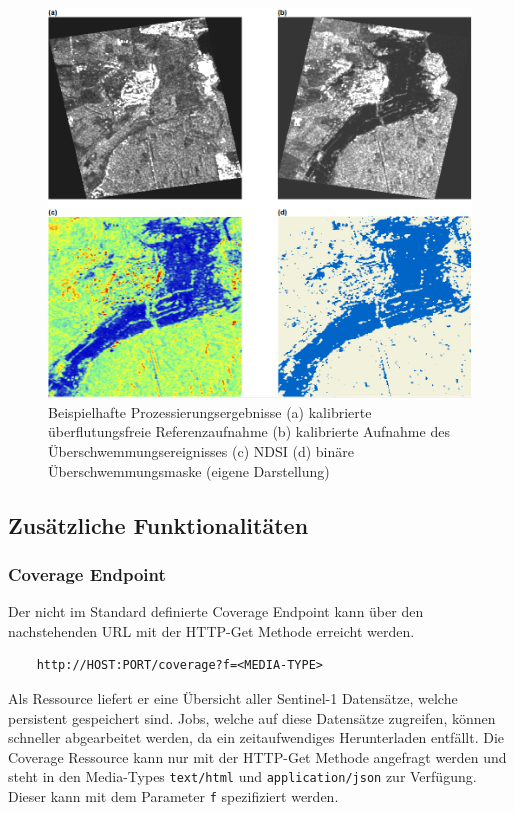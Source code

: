 \begin{figure}[H]
    \centering
    \includegraphics[width=\textwidth]{Bilder/prozess.png}
    \caption{Beispielhafte Prozessierungsergebnisse (a) kalibrierte überflutungsfreie Referenzaufnahme (b) kalibrierte Aufnahme des Überschwemmungsereignisses (c) NDSI  (d) binäre Überschwemmungsmaske (eigene Darstellung)}
    \label{pre_post_ndsi}
\end{figure}


\subsection{Zusätzliche Funktionalitäten}
\subsubsection{Coverage Endpoint} 
Der nicht im Standard definierte Coverage Endpoint kann über den nachstehenden URL mit der HTTP-Get Methode erreicht werden. 
\begin{center}
\begin{BVerbatim}
    http://HOST:PORT/coverage?f=<MEDIA-TYPE>
\end{BVerbatim}
\end{center}
Als Ressource liefert er eine Übersicht aller Sentinel-1 Datensätze, welche persistent gespeichert sind. 
Jobs, welche auf diese Datensätze zugreifen, können schneller abgearbeitet werden, da ein zeitaufwendiges Herunterladen entfällt. 
Die Coverage Ressource kann nur mit der HTTP-Get Methode angefragt werden und steht in den Media-Types \verb|text/html| und \verb|application/json|
zur Verfügung. Dieser kann mit dem Parameter \verb|f| spezifiziert werden.

